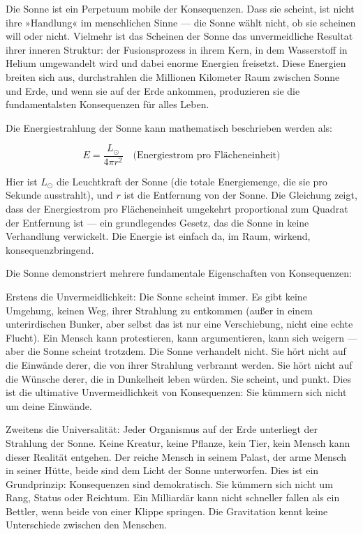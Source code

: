 \documentclass[12pt,a4paper]{article}
\begin{document}
Die Sonne ist ein Perpetuum mobile der Konsequenzen. Dass sie scheint, ist nicht ihre »Handlung« im menschlichen Sinne — die Sonne wählt nicht, ob sie scheinen will oder nicht. Vielmehr ist das Scheinen der Sonne das unvermeidliche Resultat ihrer inneren Struktur: der Fusionsprozess in ihrem Kern, in dem Wasserstoff in Helium umgewandelt wird und dabei enorme Energien freisetzt. Diese Energien breiten sich aus, durchstrahlen die Millionen Kilometer Raum zwischen Sonne und Erde, und wenn sie auf der Erde ankommen, produzieren sie die fundamentalsten Konsequenzen für alles Leben.

Die Energiestrahlung der Sonne kann mathematisch beschrieben werden als:

\begin{equation}
E = \frac{L_{\odot}}{4\pi r^2} \quad \text{(Energiestrom pro Flächeneinheit)}
\end{equation}

Hier ist $L_{\odot}$ die Leuchtkraft der Sonne (die totale Energiemenge, die sie pro Sekunde ausstrahlt), und $r$ ist die Entfernung von der Sonne. Die Gleichung zeigt, dass der Energiestrom pro Flächeneinheit umgekehrt proportional zum Quadrat der Entfernung ist — ein grundlegendes Gesetz, das die Sonne in keine Verhandlung verwickelt. Die Energie ist einfach da, im Raum, wirkend, konsequenzbringend.

Die Sonne demonstriert mehrere fundamentale Eigenschaften von Konsequenzen:

Erstens die Unvermeidlichkeit: Die Sonne scheint immer. Es gibt keine Umgehung, keinen Weg, ihrer Strahlung zu entkommen (außer in einem unterirdischen Bunker, aber selbst das ist nur eine Verschiebung, nicht eine echte Flucht). Ein Mensch kann protestieren, kann argumentieren, kann sich weigern — aber die Sonne scheint trotzdem. Die Sonne verhandelt nicht. Sie hört nicht auf die Einwände derer, die von ihrer Strahlung verbrannt werden. Sie hört nicht auf die Wünsche derer, die in Dunkelheit leben würden. Sie scheint, und punkt. Dies ist die ultimative Unvermeidlichkeit von Konsequenzen: Sie kümmern sich nicht um deine Einwände.

Zweitens die Universalität: Jeder Organismus auf der Erde unterliegt der Strahlung der Sonne. Keine Kreatur, keine Pflanze, kein Tier, kein Mensch kann dieser Realität entgehen. Der reiche Mensch in seinem Palast, der arme Mensch in seiner Hütte, beide sind dem Licht der Sonne unterworfen. Dies ist ein Grundprinzip: Konsequenzen sind demokratisch. Sie kümmern sich nicht um Rang, Status oder Reichtum. Ein Milliardär kann nicht schneller fallen als ein Bettler, wenn beide von einer Klippe springen. Die Gravitation kennt keine Unterschiede zwischen den Menschen.
\end{document}
